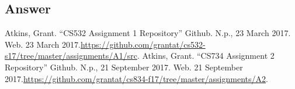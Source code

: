 \documentclass[letterpaper,11pt]{article}
\begin{document}
\subsection*{Answer}


\clearpage



\begin{thebibliography}{9}
Atkins, Grant. ``CS532 Assignment 1 Repository'' Github. N.p., 23 March 2017. Web. 23 March 2017.\url{https://github.com/grantat/cs532-s17/tree/master/assignments/A1/src}.
Atkins, Grant. ``CS734 Assignment 2 Repository'' Github. N.p., 21 September 2017. Web. 21 September 2017.\url{https://github.com/grantat/cs834-f17/tree/master/assignments/A2}.
\end{thebibliography}
\end{document}
